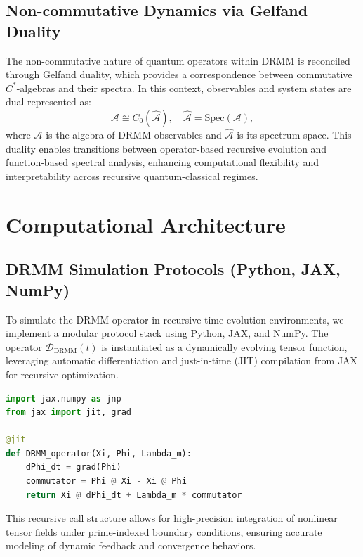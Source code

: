 \documentclass{article}
\theoremstyle{plain}
\begin{document}
\subsection{Non-commutative Dynamics via Gelfand Duality}

The non-commutative nature of quantum operators within DRMM is reconciled through Gelfand duality, which provides a correspondence between commutative $C^*$-algebras and their spectra. In this context, observables and system states are dual-represented as:
\begin{equation}
\mathcal{A} \cong C_0(\hat{\mathcal{A}}), \quad \hat{\mathcal{A}} = \text{Spec}(\mathcal{A}),
\end{equation}
where $\mathcal{A}$ is the algebra of DRMM observables and $\hat{\mathcal{A}}$ is its spectrum space. This duality enables transitions between operator-based recursive evolution and function-based spectral analysis, enhancing computational flexibility and interpretability across recursive quantum-classical regimes.

\section{Computational Architecture}

\subsection{DRMM Simulation Protocols (Python, JAX, NumPy)}

To simulate the DRMM operator in recursive time-evolution environments, we implement a modular protocol stack using Python, JAX, and NumPy. The operator $\mathcal{D}_{\text{DRMM}}(t)$ is instantiated as a dynamically evolving tensor function, leveraging automatic differentiation and just-in-time (JIT) compilation from JAX for recursive optimization.

\begin{lstlisting}[language=Python, caption=Recursive DRMM Tensor Evolution]
import jax.numpy as jnp
from jax import jit, grad

@jit
def DRMM_operator(Xi, Phi, Lambda_m):
    dPhi_dt = grad(Phi)
    commutator = Phi @ Xi - Xi @ Phi
    return Xi @ dPhi_dt + Lambda_m * commutator
\end{lstlisting}

This recursive call structure allows for high-precision integration of nonlinear tensor fields under prime-indexed boundary conditions, ensuring accurate modeling of dynamic feedback and convergence behaviors.
\end{document}
